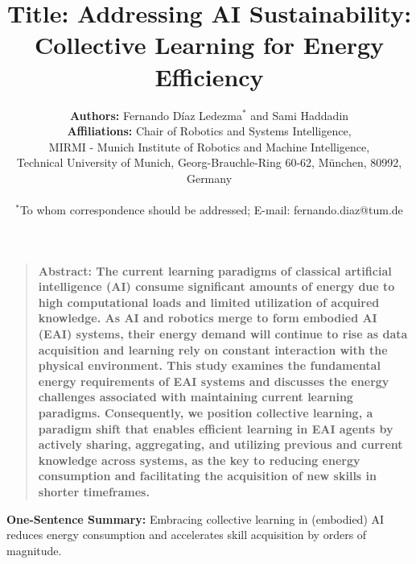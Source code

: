 \documentclass[12pt]{article}
\title{\textbf{Title:} Addressing AI Sustainability: Collective Learning for Energy Efficiency}
\author
{\textbf{Authors:} Fernando D\'iaz Ledezma$^{\ast}$ and Sami Haddadin
	\\
	\normalsize{\textbf{Affiliations:} Chair of Robotics and Systems Intelligence,}\\
	\normalsize{MIRMI - Munich Institute of Robotics and Machine Intelligence,}\\
	\normalsize{Technical University of Munich, Georg-Brauchle-Ring 60-62, M\"unchen, 80992, Germany}\\
	\\
	\normalsize{$^\ast$To whom correspondence should be addressed; E-mail: fernando.diaz@tum.de}
}
\date{}
\newenvironment{sciabstract}{%
\begin{quote} \bf}
{\end{quote}}
\begin{document}
 

\baselineskip24pt


\maketitle 



\begin{sciabstract}
	\textbf{Abstract:} The current learning paradigms of classical artificial intelligence (AI) consume significant amounts of energy due to high computational loads and limited utilization of acquired knowledge. As AI and robotics merge to form embodied AI (EAI) systems, their energy demand will continue to rise as data acquisition and learning rely on constant interaction with the physical environment. This study examines the fundamental energy requirements of EAI systems and discusses the energy challenges associated with maintaining current learning paradigms. Consequently, we position collective learning, a paradigm shift that enables efficient learning in EAI agents by actively sharing, aggregating, and utilizing previous and current knowledge across systems, as the key to reducing energy consumption and facilitating the acquisition of new skills in shorter timeframes.
\end{sciabstract}

\textbf{One-Sentence Summary:} Embracing collective learning in (embodied) AI reduces energy consumption and accelerates skill acquisition by orders of magnitude.

\end{document}
